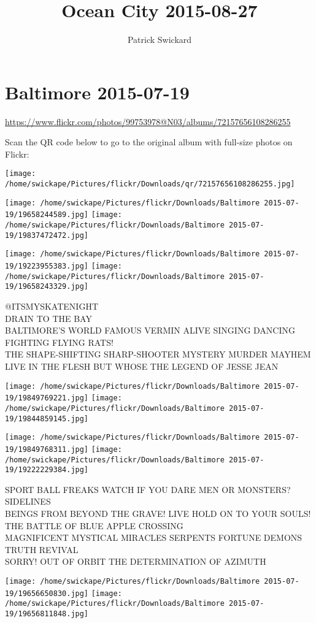 \documentclass[10pt,letterpaper]{article}
\title{Ocean City 2015-08-27}
\author{Patrick Swickard}
\date{}
\begin{document}
\section*{Baltimore 2015-07-19}

\url{https://www.flickr.com/photos/99753978@N03/albums/72157656108286255}

Scan the QR code below to go to the original album with full-size photos on Flickr:

\texttt{[image: /home/swickape/Pictures/flickr/Downloads/qr/72157656108286255.jpg]}
\pagebreak

\texttt{[image: /home/swickape/Pictures/flickr/Downloads/Baltimore 2015-07-19/19658244589.jpg]}
\texttt{[image: /home/swickape/Pictures/flickr/Downloads/Baltimore 2015-07-19/19837472472.jpg]}

\texttt{[image: /home/swickape/Pictures/flickr/Downloads/Baltimore 2015-07-19/19223955383.jpg]}
\texttt{[image: /home/swickape/Pictures/flickr/Downloads/Baltimore 2015-07-19/19658243329.jpg]}

@ITSMYSKATENIGHT\\
DRAIN TO THE BAY\\
BALTIMORE'S WORLD FAMOUS VERMIN ALIVE SINGING DANCING FIGHTING FLYING RATS!\\
THE SHAPE{-}SHIFTING SHARP{-}SHOOTER MYSTERY MURDER MAYHEM LIVE IN THE FLESH BUT WHOSE THE LEGEND OF JESSE JEAN
\pagebreak

\texttt{[image: /home/swickape/Pictures/flickr/Downloads/Baltimore 2015-07-19/19849769221.jpg]}
\texttt{[image: /home/swickape/Pictures/flickr/Downloads/Baltimore 2015-07-19/19844859145.jpg]}

\texttt{[image: /home/swickape/Pictures/flickr/Downloads/Baltimore 2015-07-19/19849768311.jpg]}
\texttt{[image: /home/swickape/Pictures/flickr/Downloads/Baltimore 2015-07-19/19222229384.jpg]}

SPORT BALL FREAKS WATCH IF YOU DARE MEN OR MONSTERS?  SIDELINES\\
BEINGS FROM BEYOND THE GRAVE!   LIVE HOLD ON TO YOUR SOULS!  THE BATTLE OF BLUE APPLE CROSSING\\
MAGNIFICENT MYSTICAL MIRACLES SERPENTS FORTUNE DEMONS TRUTH REVIVAL\\
SORRY!  OUT OF ORBIT THE DETERMINATION OF AZIMUTH
\pagebreak

\texttt{[image: /home/swickape/Pictures/flickr/Downloads/Baltimore 2015-07-19/19656650830.jpg]}
\texttt{[image: /home/swickape/Pictures/flickr/Downloads/Baltimore 2015-07-19/19656811848.jpg]}
\end{document}
